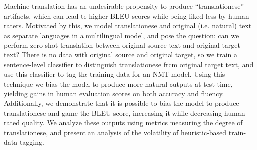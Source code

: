 Machine translation has an undesirable propensity to produce ``translationese'' artifacts, which can lead to higher BLEU scores while being liked less by human raters. Motivated by this, we model translationese and original (i.e. natural) text as separate languages in a multilingual model, and pose the question: can we perform zero-shot translation between original source text and original target text? There is no data with original source and original target, so we train a sentence-level classifier to distinguish translationese from original target text, and use this classifier to tag the training data for an NMT model. Using this technique we bias the model to produce more natural outputs at test time, yielding gains in human evaluation scores on both accuracy and fluency. Additionally, we demonstrate that it is possible to bias the model to produce translationese and game the BLEU score, increasing it while decreasing human-rated quality. We analyze these outputs using metrics measuring the degree of translationese, and present an analysis of the volatility of heuristic-based train-data tagging.
